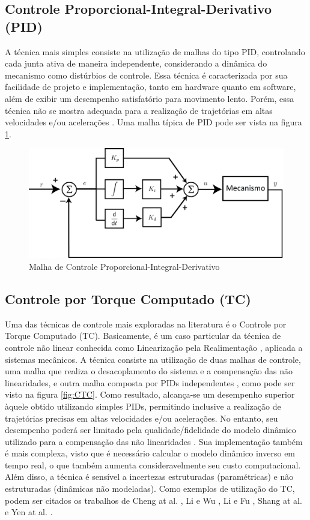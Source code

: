 \documentclass[]{politex}
\begin{document}
\subsection{Controle Proporcional-Integral-Derivativo (PID)}

A técnica mais simples consiste na utilização de malhas do tipo PID, controlando cada junta ativa de maneira independente, considerando a dinâmica do mecanismo como distúrbios de controle. Essa técnica é caracterizada por sua facilidade de projeto e implementação, tanto em hardware quanto em software, além de exibir um desempenho satisfatório para movimento lento. Porém, essa técnica não se mostra adequada para a realização de trajetórias em altas velocidades e/ou acelerações \cite{Honegger, Zubizarreta}. Uma malha típica de PID pode ser vista na figura \ref{fig:PID}.

\begin{figure}[h]
	\centering
	\includegraphics[scale=0.45]{../figures/PID.jpg}  
	\caption{Malha de Controle Proporcional-Integral-Derivativo}
	\label{fig:PID}
\end{figure}

\subsection{Controle por Torque Computado (TC)}

Uma das técnicas de controle mais exploradas na literatura é o Controle por Torque Computado (TC). Basicamente, é um caso particular da técnica de controle não linear conhecida como Linearização pela Realimentação \cite{Slotini}, aplicada a sistemas mecânicos. A técnica consiste na utilização de duas malhas de controle, uma malha que realiza o desacoplamento do sistema e a compensação das não linearidades, e outra malha composta por PIDs independentes \cite{Craig}, como pode ser visto na figura \ref{fig:CTC}. Como resultado, alcança-se um desempenho  superior  àquele obtido utilizando simples PIDs, permitindo inclusive a realização de trajetórias precisas em altas velocidades e/ou acelerações. No entanto, seu desempenho poderá ser limitado pela qualidade/fidelidade do modelo dinâmico utilizado para a compensação das não linearidades \cite{SlotiniSMC}. Sua implementação também é mais complexa, visto que é necessário calcular o modelo dinâmico inverso em tempo real, o que também aumenta consideravelmente seu custo computacional. Além disso, a técnica é sensível a incertezas estruturadas (paramétricas) e não estruturadas (dinâmicas não modeladas). Como exemplos de utilização do TC, podem ser citados os trabalhos de Cheng at al. \cite{Cheng}, Li e Wu \cite{Li}, Li e Fu \cite{Li2}, Shang at al. \cite{Shang} e Yen at al. \cite{Yen}.
\end{document}
